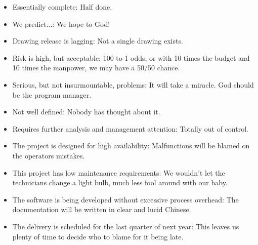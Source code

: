 \begin{itemize}
		\item Essentially complete: Half done. 
	
		\item We predict...: We hope to God! 
	
		\item Drawing release is lagging: Not a single drawing exists. 
	
		\item Risk is high, but acceptable: 100 to 1 odds, or with 10 times the budget and 10 times the manpower, we may have a 50/50 chance. 
	
		\item Serious, but not insurmountable, problems: It will take a miracle. God should be the program manager. 
	
		\item Not well defined: Nobody has thought about it. 
	
		\item Requires further analysis and management attention: Totally out of control. 
	
		\item The project is designed for high availability: Malfunctions will be blamed on the operators mistakes. 
	
		\item This project has low maintenance requirements: We wouldn't let the technicians change a light bulb, much less fool around with our baby. 
	
		\item The software is being developed without excessive process overhead: The documentation will be written in clear and lucid Chinese. 
	
		\item The delivery is scheduled for the last quarter of next year: This leaves us plenty of time to decide who to blame for it being late. 
	\end{itemize}
	
	\begin{center}\underline{\hspace{5 cm}}\end{center}

